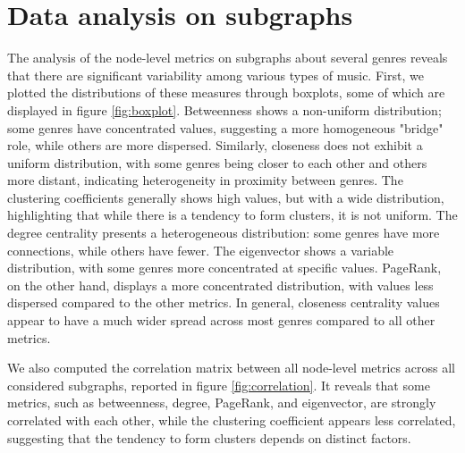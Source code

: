 \section{Data analysis on subgraphs}
The analysis of the node-level metrics on subgraphs about several genres reveals that there are significant variability among various types of music. First, we plotted the distributions of these measures through boxplots, some of which are displayed in figure \ref{fig:boxplot}.
Betweenness shows a non-uniform distribution; some genres have concentrated values, suggesting a more homogeneous "bridge" role, while others are more dispersed. 
Similarly, closeness does not exhibit a uniform distribution, with some genres being closer to each other and others more distant, indicating heterogeneity in proximity between genres. 
The clustering coefficients generally shows high values, but with a wide distribution, highlighting that while there is a tendency to form clusters, it is not uniform. The degree centrality presents a heterogeneous distribution: some genres have more connections, while others have fewer.
The eigenvector shows a variable distribution, with some genres more concentrated at specific values. PageRank, on the other hand, displays a more concentrated distribution, with values less dispersed compared to the other metrics. In general, closeness centrality values appear to have a much wider spread across most genres compared to all other metrics.

We also computed the correlation matrix between all node-level metrics across all considered subgraphs, reported in figure \ref{fig:correlation}. It reveals that some metrics, such as betweenness, degree, PageRank, and eigenvector, are strongly correlated with each other, while the clustering coefficient appears less correlated, suggesting that the tendency to form clusters depends on distinct factors.